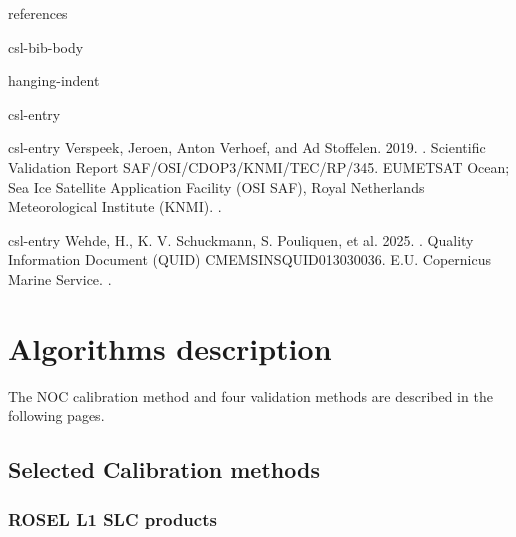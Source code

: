 \documentclass[a4paper,10pt,english]{sphinxmanual}
\begin{document}
\begin{sphinxuseclass}{references}
\begin{sphinxuseclass}{csl-bib-body}
\begin{sphinxuseclass}{hanging-indent}
\begin{sphinxuseclass}{csl-entry}
\end{sphinxuseclass}
\begin{sphinxuseclass}{csl-entry}
\sphinxAtStartPar
Verspeek, Jeroen, Anton Verhoef, and Ad Stoffelen. 2019. . Scientific Validation Report SAF/OSI/CDOP3/KNMI/TEC/RP/345. EUMETSAT Ocean; Sea Ice Satellite Application Facility (OSI SAF), Royal Netherlands Meteorological Institute (KNMI). .

\end{sphinxuseclass}
\begin{sphinxuseclass}{csl-entry}
\sphinxAtStartPar
Wehde, H., K. V. Schuckmann, S. Pouliquen, et al. 2025. . Quality Information Document (QUID) CMEMS\sphinxhyphen{}INS\sphinxhyphen{}QUID\sphinxhyphen{}013\sphinxhyphen{}030\sphinxhyphen{}036. E.U. Copernicus Marine Service. .

\end{sphinxuseclass}
\end{sphinxuseclass}
\end{sphinxuseclass}
\end{sphinxuseclass}
\sphinxstepscope


\chapter{Algorithms description}
\label{\detokenize{03_algorithms:algorithms-description}}\label{\detokenize{03_algorithms::doc}}
\sphinxAtStartPar
The NOC calibration method and four validation methods are described
in the following pages.

\sphinxstepscope


\section{Selected Calibration methods}
\label{\detokenize{alg-01-calibration:selected-calibration-methods}}\label{\detokenize{alg-01-calibration::doc}}

\subsection{ROSE\sphinxhyphen{}L L1 SLC products}
\label{\detokenize{alg-01-calibration:rose-l-l1-slc-products}}
\end{document}

